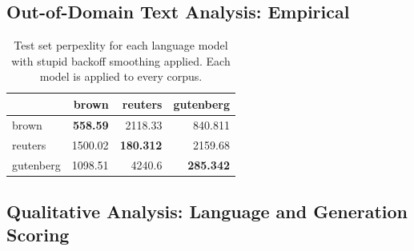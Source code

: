 \documentclass[11pt,a4paper]{article}
\begin{document}

\subsection{Out-of-Domain Text Analysis: Empirical}%
\label{sec:out_domain_text_analysis_empirical}


\begin{table}[h]
\begin{tabular}{lrrr}
\hline
           &   brown &   reuters &   gutenberg \\
\hline
 brown     &  \textbf{ 558.59 } &  2118.33  &     840.811 \\
 reuters   & 1500.02 &   \textbf{ 180.312 } &    2159.68  \\
 gutenberg & 1098.51 &  4240.6   &     \textbf{ 285.342 } \\
\hline
\end{tabular}
\caption{Test set perpexlity for each language model with
  stupid backoff smoothing applied. Each model is applied to 
every corpus.}
\label{table:backoff_test_perp}
\end{table}


\subsection{Qualitative Analysis: Language and Generation Scoring}
\label{sub:out_domain_text_analysis_qualitative}
\end{document}
